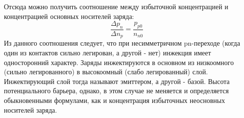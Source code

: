 Отсюда можно получить соотношение между избыточной концентрацией и концентрацией основных носителей заряда:
\begin{equation}
\frac{\Delta p_n}{\Delta n_p} = \frac{p_{p0}}{n_{n0}}
\end{equation}
Из данного соотношения следует, что при несимметричном pn-переходе (когда один из контактов сильно легирован, а другой - нет) инжекция имеет односторонний характер. Заряды инжектируются в основном из низкоомного (сильно легированного) в высокоомный (слабо легированный) слой. Инжектирующий слой тогда называют эмиттером, а другой - базой. Высота потенциального барьера, однако, в этом случае не меняется и определяется обыкновенными формулами, как и концентрация избыточных неосновных носителей заряда.



\pagebreak

